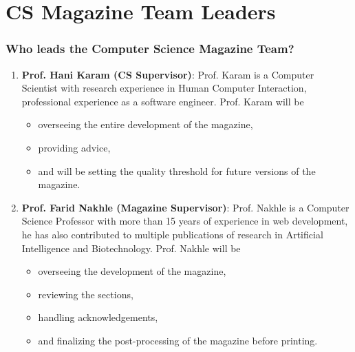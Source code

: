 \documentclass{beamer}
\begin{document}
\section{CS Magazine Team Leaders}
\begin{frame}
    \frametitle{Who leads the Computer Science Magazine Team?}

        \begin{enumerate}

            \item<1-> 
                \textbf{Prof. Hani Karam (CS Supervisor)}: \small{Prof. Karam is a Computer Scientist with research experience in Human Computer Interaction, professional experience as a software engineer.} \pause Prof. Karam will be 

                \begin{itemize}

                    \item<3-> overseeing the entire development of the magazine, 
                    \item<4-> providing advice, 
                    \item<5-> and will be setting the quality threshold for future versions of the magazine. 

                \end{itemize}

            \item<6-> 
                \textbf{Prof. Farid Nakhle (Magazine Supervisor)}: \small{Prof. Nakhle is a Computer Science Professor with more than 15 years of experience in web development, he has also contributed to multiple publications of research in Artificial Intelligence and Biotechnology.} \pause Prof. Nakhle will be 

                \begin{itemize}

                    \item<7-> overseeing the development of the magazine, 
                    \item<8-> reviewing the sections, 
                    \item<9-> handling acknowledgements,
                    \item<10-> and finalizing the post-processing of the magazine before printing. 

                \end{itemize}
 
        \end{enumerate}

\end{frame}
\end{document}
